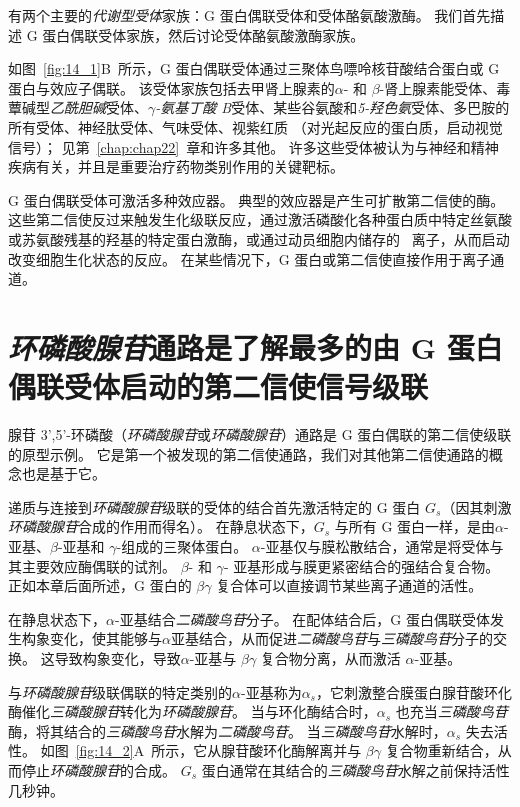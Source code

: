 有两个主要的\textit{代谢型受体}家族：G 蛋白偶联受体和受体酪氨酸激酶。
我们首先描述 G 蛋白偶联受体家族，然后讨论受体酪氨酸激酶家族。


如图~\ref{fig:14_1}B~所示，G 蛋白偶联受体通过三聚体鸟嘌呤核苷酸结合蛋白或 G 蛋白与效应子偶联。
该受体家族包括去甲肾上腺素的$\alpha$- 和 $\beta$-肾上腺素能受体、毒蕈碱型\textit{乙酰胆碱}受体、\textit{$\gamma$-氨基丁酸 B}受体、某些谷氨酸和\textit{5-羟色氨}受体、多巴胺的所有受体、神经肽受体、气味受体、视紫红质 （对光起反应的蛋白质，启动视觉信号）；
见第~\ref{chap:chap22}~章和许多其他。
许多这些受体被认为与神经和精神疾病有关，并且是重要治疗药物类别作用的关键靶标。


G 蛋白偶联受体可激活多种效应器。
典型的效应器是产生可扩散第二信使的酶。
这些第二信使反过来触发生化级联反应，通过激活磷酸化各种蛋白质中特定丝氨酸或苏氨酸残基的羟基的特定蛋白激酶，或通过动员细胞内储存的~ 离子，从而启动改变细胞生化状态的反应。
在某些情况下，G 蛋白或第二信使直接作用于离子通道。



\section{\textit{环磷酸腺苷}通路是了解最多的由 G 蛋白偶联受体启动的第二信使信号级联}

腺苷 3',5'-环磷酸（\textit{环磷酸腺苷}或\textit{环磷酸腺苷}）通路是 G 蛋白偶联的第二信使级联的原型示例。
它是第一个被发现的第二信使通路，我们对其他第二信使通路的概念也是基于它。


递质与连接到\textit{环磷酸腺苷}级联的受体的结合首先激活特定的 G 蛋白 $ G_s $（因其刺激\textit{环磷酸腺苷}合成的作用而得名）。
在静息状态下，$ G_s $ 与所有 G 蛋白一样，是由$\alpha$-亚基、$\beta$-亚基和 $\gamma$-组成的三聚体蛋白。
$\alpha$-亚基仅与膜松散结合，通常是将受体与其主要效应酶偶联的试剂。
$\beta$- 和 $\gamma$- 亚基形成与膜更紧密结合的强结合复合物。
正如本章后面所述，G 蛋白的 $\beta \gamma$ 复合体可以直接调节某些离子通道的活性。


在静息状态下，$\alpha$-亚基结合\textit{二磷酸鸟苷}分子。
在配体结合后，G 蛋白偶联受体发生构象变化，使其能够与$\alpha$亚基结合，从而促进\textit{二磷酸鸟苷}与\textit{三磷酸鸟苷}分子的交换。
这导致构象变化，导致$\alpha$-亚基与 $\beta \gamma$ 复合物分离，从而激活 $\alpha$-亚基。


与\textit{环磷酸腺苷}级联偶联的特定类别的$\alpha$-亚基称为$\alpha_s$，它刺激整合膜蛋白腺苷酸环化酶催化\textit{三磷酸腺苷}转化为\textit{环磷酸腺苷}。
当与环化酶结合时，$\alpha_s$ 也充当\textit{三磷酸鸟苷}酶，将其结合的\textit{三磷酸鸟苷}水解为\textit{二磷酸鸟苷}。
当\textit{三磷酸鸟苷}水解时，$\alpha_s$ 失去活性。
如图~\ref{fig:14_2}A~所示，它从腺苷酸环化酶解离并与 $\beta \gamma$ 复合物重新结合，从而停止\textit{环磷酸腺苷}的合成。
$ G_s $ 蛋白通常在其结合的\textit{三磷酸鸟苷}水解之前保持活性几秒钟。


